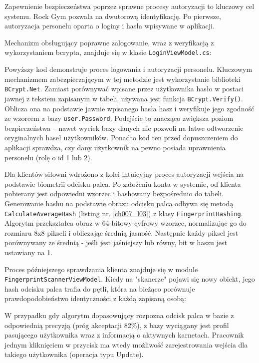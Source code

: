 Zapewnienie bezpieczeństwa poprzez sprawne procesy autoryzacji to kluczowy cel systemu. Rock Gym pozwala na dwutorową identyfikację. Po pierwsze, autoryzacja personelu oparta o loginy i hasła wpisywane w aplikacji.

Mechanizm obsługujący poprawne zalogowanie, wraz z weryfikacją z wykorzystaniem bcrypta, znajduje się w klasie \texttt{LoginViewModel.cs}:



Powyższy kod demonstruje proces logowania i autoryzacji personelu. Kluczowym mechanizmem zabezpieczającym w tej metodzie jest wykorzystanie biblioteki \texttt{BCrypt.Net}. Zamiast porównywać wpisane przez użytkownika hasło w postaci jawnej z tekstem zapisanym w tabeli, używana jest funkcja \texttt{BCrypt.Verify()}. Oblicza ona na podstawie jawnie wpisanego hasła hasz i weryfikuje jego zgodność ze wzorcem z bazy \texttt{user.Password}. Podejście to znacząco zwiększa poziom bezpieczeństwa -- nawet wyciek bazy danych nie pozwoli na łatwe odtworzenie oryginalnych haseł użytkowników. Ponadto kod ten przed dopuszczeniem do aplikacji sprawdza, czy dany użytkownik na pewno posiada uprawnienia personelu (rolę o id 1 lub 2).

Dla klientów siłowni wdrożono z kolei intuicyjny proces autoryzacji wejścia na podstawie biometrii odcisku palca. Po założeniu konta w systemie, od klienta pobierany jest odpowiedni wzorzec i hashowany bezpośrednio do tabeli. Generowanie hashu na podstawie obrazu odcisku palca odbywa się metodą \texttt{CalculateAverageHash} (listing nr. \ref{ch007_l03}) z klasy \texttt{FingerprintHashing}. Algorytm przekształca obraz w 64-bitowy cyfrowy wzorzec, normalizując go do rozmiaru 8x8 pikseli i obliczając średnią jasność. Następnie każdy piksel jest porównywany ze średnią - jeśli jest jaśniejszy lub równy, bit w haszu jest ustawiany na 1.



Proces późniejszego sprawdzania klienta znajduje się w module \texttt{FingerprintScannerViewModel}. Kiedy na "skanerze" pojawi się nowy obiekt, jego hash odcisku palca trafia do pętli, która na bieżąco porównuje prawdopodobieństwo identyczności z każdą zapisaną osobą:



W przypadku gdy algorytm dopasowujący rozpozna odcisk palca w bazie z odpowiednią precyzją (próg akceptacji 82\%), z bazy wyciągany jest profil pasującego użytkownika wraz z informacją o aktywnych karnetach. Pracownik jednym kliknięciem w przycisk ma wtedy możliwość zarejestrowania wejścia dla takiego użytkownika (operacja typu Update).
